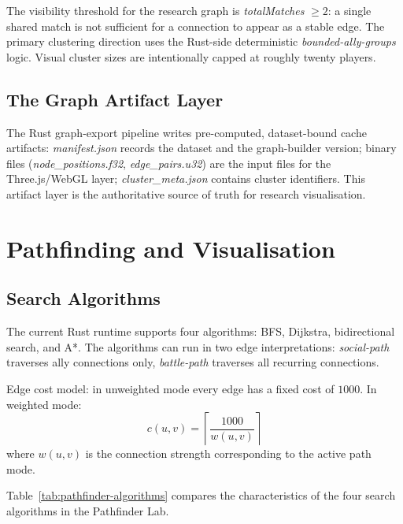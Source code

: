 The visibility threshold for the research graph is \textit{totalMatches} $\geq 2$: a single shared match is not sufficient for a connection to appear as a stable edge. The primary clustering direction uses the Rust-side deterministic \textit{bounded-ally-groups} logic. Visual cluster sizes are intentionally capped at roughly twenty players.

\subsection{The Graph Artifact Layer}

The Rust graph-export pipeline writes pre-computed, dataset-bound cache artifacts: \textit{manifest.json} records the dataset and the graph-builder version; binary files (\textit{node\_positions.f32}, \textit{edge\_pairs.u32}) are the input files for the Three.js/WebGL layer; \textit{cluster\_meta.json} contains cluster identifiers. This artifact layer is the authoritative source of truth for research visualisation.

\section{Pathfinding and Visualisation}

\subsection{Search Algorithms}

The current Rust runtime supports four algorithms: BFS, Dijkstra, bidirectional search, and A*. The algorithms can run in two edge interpretations: \textit{social-path} traverses ally connections only, \textit{battle-path} traverses all recurring connections.

Edge cost model: in unweighted mode every edge has a fixed cost of $1000$. In weighted mode:
\begin{equation}
c(u,v)=\left\lceil \frac{1000}{w(u,v)} \right\rceil
\end{equation}
where $w(u,v)$ is the connection strength corresponding to the active path mode.

Table~\ref{tab:pathfinder-algorithms} compares the characteristics of the four search algorithms in the Pathfinder Lab.

